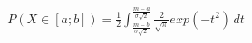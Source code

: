 \documentclass[preview]{standalone}
\begin{document}
\begin{align*}
P( X \in [a;b] ) = { \frac{1}{2} } \int_{ \frac{m - b}{\sigma \sqrt{2}} }^{ \frac{m - a}{\sigma \sqrt{2}} } { { \frac{2}{\sqrt{\pi}} } exp( -t^2 ) } \, dt
\end{align*}
\end{document}
